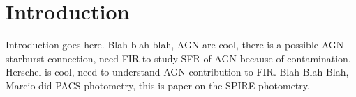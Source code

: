\section{Introduction}
Introduction goes here.
Blah blah blah, AGN are cool, there is a possible AGN-starburst connection, need FIR to study SFR of AGN because of contamination. Herschel is cool, need to understand AGN contribution to FIR. Blah Blah Blah, Marcio did PACS photometry, this is paper on the SPIRE photometry.